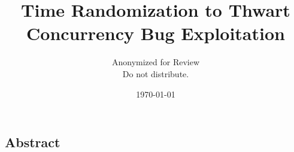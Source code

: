 \documentclass[letterpaper,twocolumn,10pt]{article}
\begin{document}
\date{\today}

\title{\Large \bf Time Randomization to Thwart Concurrency Bug Exploitation}

\author{
{\rm Anonymized for Review}\\
Do not distribute.
} %

\maketitle

\subsection*{Abstract}


%
%
%
%
%
%
%
%
%
%
%
\end{document}
